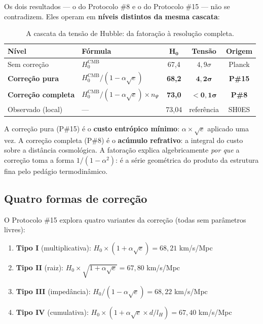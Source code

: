 \documentclass[12pt,a4paper,twoside]{article}
\newcommand{\alphaii}{\alpha^{2}}
\begin{document}
Os dois resultados --- o do Protocolo \#8 e o do Protocolo \#15 --- não se contradizem. Eles operam em \textbf{níveis distintos da mesma cascata}:

\begin{table}[H]
\centering
\caption{A cascata da tensão de Hubble: da fatoração à resolução completa.}
\label{tab:cascata}
\begin{tabular}{llccc}
\toprule
\textbf{Nível} & \textbf{Fórmula} & $\boldsymbol{H_0}$ & \textbf{Tensão} & \textbf{Origem} \\
\midrule
Sem correção & $H_0^{\text{CMB}}$ & 67{,}4 & $4{,}9\sigma$ & Planck \\
\textbf{Correção pura} & $H_0^{\text{CMB}}/(1 - \alpha\sqrt{e})$ & \textbf{68{,}2} & $\boldsymbol{4{,}2\sigma}$ & \textbf{P\#15} \\
\textbf{Correção completa} & $H_0^{\text{CMB}}/(1 - \alpha\sqrt{e}) \times n_\Psi$ & \textbf{73{,}0} & $\boldsymbol{< 0{,}1\sigma}$ & \textbf{P\#8} \\
\midrule
Observado (local) & --- & 73{,}04 & referência & SH0ES \\
\bottomrule
\end{tabular}
\end{table}

\noindent A correção pura (P\#15) é o \textbf{custo entrópico mínimo}: $\alpha \times \sqrt{e}$ aplicado uma vez. A correção completa (P\#8) é o \textbf{acúmulo refrativo}: a integral do custo sobre a distância cosmológica. A fatoração explica algebricamente \textit{por que} a correção toma a forma $1/(1 - \alphaii)$: é a série geométrica do produto da estrutura fina pelo pedágio termodinâmico.


\subsection{Quatro formas de correção}

O Protocolo \#15 explora quatro variantes da correção (todas sem parâmetros livres):

\begin{enumerate}[nosep]
\item \textbf{Tipo I} (multiplicativa): $H_0 \times (1 + \alpha\sqrt{e}) = 68{,}21$ km/s/Mpc
\item \textbf{Tipo II} (raiz): $H_0 \times \sqrt{1 + \alpha\sqrt{e}} = 67{,}80$ km/s/Mpc
\item \textbf{Tipo III} (impedância): $H_0 / (1 - \alpha\sqrt{e}) = 68{,}22$ km/s/Mpc
\item \textbf{Tipo IV} (cumulativa): $H_0 \times (1 + \alpha\sqrt{e} \times d/l_H) = 67{,}40$ km/s/Mpc
\end{enumerate}
\end{document}
